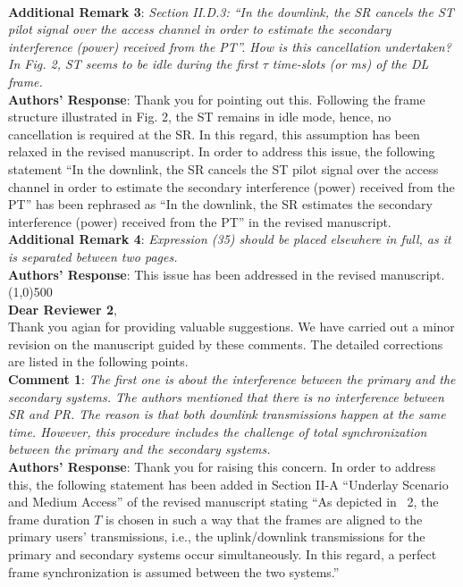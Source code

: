 \documentclass[12pt,a4wide,peerreview]{IEEEtran}
\newcommand{\tc}[1]{#1}
\begin{document}
\\
\textbf{Additional Remark 3}:
\textit{
Section II.D.3: ``In the downlink, the SR cancels the ST pilot signal over the access channel in order to estimate the secondary interference (power) received from the PT''. How is this cancellation undertaken? In Fig. 2, ST seems to be idle during the first $\tau$ time-slots (or ms) of the DL frame.
}
\\
\textbf{Authors' Response}: 
Thank you for pointing out this. Following the frame structure illustrated in Fig. 2, the ST remains in idle mode, hence, no cancellation is required at the SR. In this regard, this assumption has been relaxed in the revised manuscript. In order to address this issue, the following statement ``In the downlink, the SR cancels the ST pilot signal over the access channel in order to estimate the secondary interference (power) received from the PT'' has been rephrased as ``In the downlink, the SR estimates the secondary interference (power) received from the PT'' in the revised manuscript. 
\\
\textbf{Additional Remark 4}:
\textit{
Expression (35) should be placed elsewhere in full, as it is separated between two pages.
}
\\
\textbf{Authors' Response}: 
This issue has been addressed in the revised manuscript.
\\
\line(1,0){500} \\
\textbf{Dear Reviewer 2},\\
Thank you agian for providing valuable suggestions. We have carried out a minor revision on the manuscript guided by these comments. The detailed corrections are listed in the following points. \\
\textbf{\tc{Comment 1}}: 
\textit{
The first one is about the interference between the primary and the secondary systems. The authors mentioned that there is no interference between SR and PR. The reason is that both downlink transmissions happen at the same time. However, this procedure includes the challenge of total synchronization between the primary and the secondary systems.
}
\\
\textbf{Authors' Response}:
Thank you for raising this concern. In order to address this, the following statement has been added in Section II-A ``Underlay Scenario and Medium Access'' of the revised manuscript stating ``As depicted in \figurename~2, the frame duration $T$ is chosen in such a way that the frames are aligned to the primary users' transmissions, i.e., the uplink/downlink transmissions for the primary and secondary systems occur simultaneously. In this regard, a perfect frame synchronization is assumed between the two systems.'' 
\end{document}
